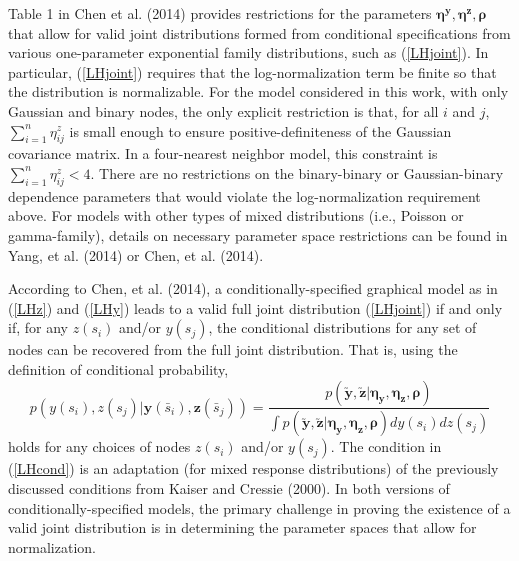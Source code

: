 \documentclass[12pt, a4paper, twoside]{article}
\begin{document}
Table 1 in Chen et al. (2014) provides restrictions for the parameters $\boldsymbol{\eta^y,\eta^z,\rho}$ that allow for valid joint distributions formed from conditional specifications from various one-parameter exponential family distributions, such as (\ref{LHjoint}). In particular, (\ref{LHjoint}) requires that the log-normalization term be finite so that the distribution is normalizable. For the model considered in this work, with only Gaussian and binary nodes, the only explicit restriction is that, for all $i$ and $j$, $\sum_{i=1}^{n}\eta^z_{ij}$ is small enough to ensure positive-definiteness of the Gaussian covariance matrix. In a four-nearest neighbor model, this constraint is $\sum_{i=1}^{n}\eta^z_{ij}<4$. There are no restrictions on the binary-binary or Gaussian-binary dependence parameters that would violate the log-normalization requirement above. For models with other types of mixed distributions (i.e., Poisson or gamma-family), details on necessary parameter space restrictions can be found in Yang, et al. (2014) or Chen, et al. (2014).

According to Chen, et al. (2014), a conditionally-specified graphical model as in (\ref{LHz}) and (\ref{LHy}) leads to a valid full joint distribution (\ref{LHjoint}) if and only if, for any $z(s_i)$ and/or $y(s_j)$, the conditional distributions for any set of nodes can be recovered from the full joint distribution. That is, using the definition of conditional probability,
\begin{equation}\label{LHcond}
p(y(s_{i}), z(s_{j}) | \boldsymbol{y}(\bar{s}_i) , \boldsymbol{z}(\bar{s}_j)) = \frac{p(\boldsymbol{\utilde{y}},\boldsymbol{\utilde{z}} | \boldsymbol{\eta_y,\eta_z,\rho})}
{\int p(\boldsymbol{\utilde{y}},\boldsymbol{\utilde{z}} | \boldsymbol{\eta_y,\eta_z,\rho}) dy(s_{i})dz(s_{j})} 
\end{equation}
holds for any choices of nodes $z(s_i)$ and/or $y(s_j)$. The condition in (\ref{LHcond}) is an adaptation (for mixed response distributions) of the previously discussed conditions from Kaiser and Cressie (2000). In both versions of conditionally-specified models, the primary challenge in proving the existence of a valid joint distribution is in determining the parameter spaces that allow for normalization.


\end{document}
